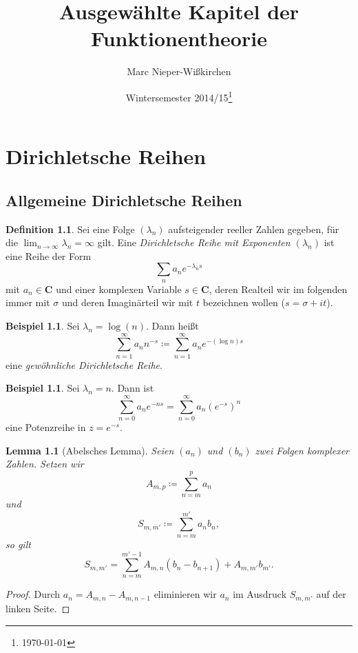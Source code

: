 \documentclass[a4paper,twoside,openright]{report}
\title{Ausgewählte Kapitel der Funktionentheorie}
\author{Marc Nieper-Wißkirchen}
\date{Wintersemester 2014/15\footnote{\today}}
\newtheorem{lem}[thm]{Lemma}
\theoremstyle{definition}
\newtheorem{dfn}[thm]{Definition}
\newtheorem{xca}[thm]{Beispiel}
\theoremstyle{remark}
\begin{document}
\maketitle

\tableofcontents

\chapter{Dirichletsche Reihen}

\section{Allgemeine Dirichletsche Reihen}

\begin{dfn}
  Sei eine Folge $(\lambda_n)$ aufsteigender reeller Zahlen gegeben, für die $\lim_{n \to \infty} \lambda_n = \infty$ gilt. Eine
  \emph{Dirichletsche Reihe mit Exponenten $(\lambda_n)$} ist eine Reihe der Form
  \[
    \sum_n a_n e^{-\lambda_n s}
  \]
  mit $a_n \in \mathbf C$ und einer komplexen Variable $s \in \mathbf C$, deren
  Realteil wir im folgenden immer mit $\sigma$ und deren Imaginärteil wir
  mit $t$ bezeichnen wollen ($s = \sigma + i t$).
\end{dfn}

\begin{xca}
  Sei $\lambda_n = \log(n)$. Dann heißt
  \[
    \sum_{n = 1}^\infty a_n n^{-s}
    \coloneqq
    \sum_{n=1}^\infty a_n e^{-(\log n) s} 
  \]
  eine \emph{gewöhnliche Dirichletsche Reihe}.
\end{xca}

\begin{xca}
  Sei $\lambda_n = n$. Dann ist
  \[
    \sum_{n = 0}^\infty a_n e^{-n s} = \sum_{n = 0}^\infty a_n (e^{-s})^n
  \]
  eine Potenzreihe in $z = e^{-s}$.
\end{xca}

\begin{lem}[Abelsches Lemma]
  \label{lem:abel}
  Seien $(a_n)$ und $(b_n)$ zwei Folgen komplexer Zahlen. Setzen wir
  \[
    A_{m, p} \coloneqq \sum_{n = m}^p a_n
  \]
  und
  \[
    S_{m, m'} \coloneqq \sum_{n = m}^{m'} a_n b_n,
  \]
  so gilt
  \[
    S_{m, m'} = \sum_{n = m}^{m' - 1} A_{m, n} (b_n - b_{n + 1}) + A_{m, m'} b_{m'}.
  \]
\end{lem}

\begin{proof}
  Durch $a_n = A_{m, n} - A_{m, n - 1}$ eliminieren wir $a_n$ im Ausdruck $S_{m, m'}$ auf
  der linken Seite.
\end{proof}
\end{document}
